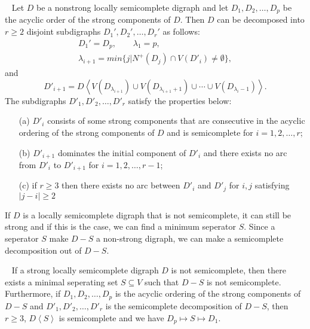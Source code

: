 \begin{thm}~\cite{bangJGT85,banggutin,bangJCT102}
    Let $D$ be a nonstrong locally semicomplete digraph and let $D_1,D_2,\dots,D_p$ be the acyclic order of the strong components of $D$. Then $D$ can be decomposed into $r\geq 2$ disjoint subdigraphs $D_1',D_2',\dots, D_r'$ as follows:
    \begin{align*}
        D_1'=D_p, \qquad \lambda_1=p,\\
        \lambda_{i+1}=min\lbrace j|N^+(D_j)\cap V(D'_i)\neq \emptyset\rbrace,
    \end{align*}
    and
    \begin{equation*}
        D'_{i+1}=D\left< V(D_{\lambda_{i+1}})\cup V(D_{\lambda_{i+1}+1})\cup \cdots \cup V(D_{\lambda_{i}-1})\right> .
    \end{equation*}
    The subdigraphs $D'_1,D'_2,\dots,D'_r$ satisfy the properties below:
    \begin{itemize}
        \item[(a)] $D'_i$ consists of some strong components that are consecutive in the acyclic ordering of the strong components of $D$ and is semicomplete for $i=1,2,\dots ,r$;
        \item[(b)] $D'_{i+1}$ dominates the initial component of $D'_i$ and there exists no arc from $D'_i$ to $D'_{i+1}$ for $i=1,2,\dots ,r-1$;
        \item[(c)] if $r\geq 3$ then there exists no arc between $D'_i$ and $D'_j$ for $i,j$ satisfying $|j-i|\geq 2$  
    \end{itemize}
    \label{thm:semicompletedecom}
\end{thm}
If $D$ is a locally semicomplete digraph that is not semicomplete, it can still be strong and if this is the case, we can find a minimum seperator $S$. Since a seperator $S$ make $D-S$ a non-strong digraph, we can make a semicomplete decomposition out of $D-S$.
\begin{thm}~\cite{banggutin}
    If a strong locally semicomplete digraph $D$ is not semicomplete, then there exists a minimal seperating set $S\subseteq V$ such that $D-S$ is not semicomplete. 
    Furthermore, if $D_1,D_2,\dots , D_p$ is the acyclic ordering of the strong components of $D-S$ and $D'_1,D'_2,\dots ,D'_r$ is the semicomplete decomposition of $D-S$, then $r\geq 3$, $D\left<S\right>$ is semicomplete and we have $D_p\mapsto S\mapsto D_1$.  
\end{thm}
